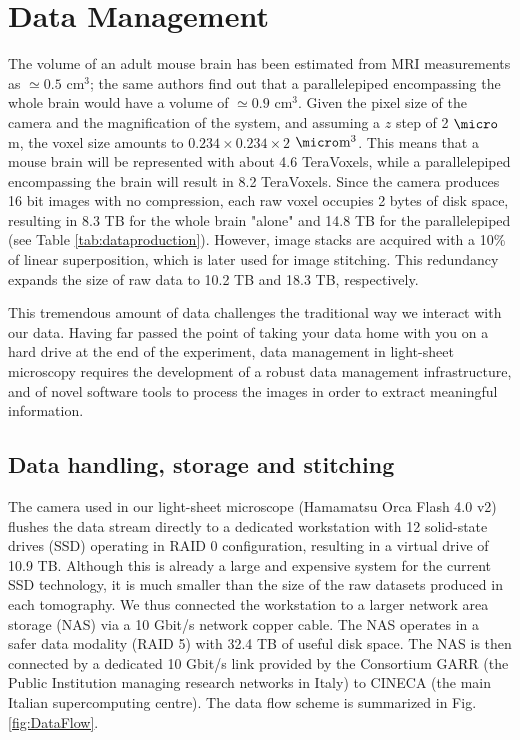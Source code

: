 \documentclass[12pt]{spieman}  %
\begin{document}
\section{Data Management}

The volume of an adult mouse brain has been estimated from MRI measurements \cite{Kovacevic2005} as $\simeq 0.5$ $\text{cm}^3$; the same authors find out that a parallelepiped encompassing the whole brain would have a volume of $\simeq 0.9$ $\text{cm}^3$. Given the pixel size of the camera and the magnification of the system, and assuming a $z$ step of 2 $\micro$m, the voxel size amounts to $0.234\times0.234\times2$ $\micro\text{m}^3$. This means that a mouse brain will be represented with about 4.6 TeraVoxels, while a parallelepiped encompassing the brain will result in 8.2 TeraVoxels. Since the camera produces 16 bit images with no compression, each raw voxel occupies 2 bytes of disk space, resulting in 8.3 TB for the whole brain "alone" and 14.8 TB for the parallelepiped (see Table \ref{tab:dataproduction}). However, image stacks are acquired with a 10\% of linear superposition, which is later used for image stitching. This redundancy expands the size of raw data to 10.2 TB and 18.3 TB, respectively.

This tremendous amount of data challenges the traditional way we interact with our data. Having far passed the point of taking your data home with you on a hard drive at the end of the experiment, data management in light-sheet microscopy requires the development of a robust data management infrastructure, and of novel software tools to process the images in order to extract meaningful information.

\subsection{Data handling, storage and stitching}

The camera used in our light-sheet microscope (Hamamatsu Orca Flash 4.0 v2) flushes the data stream directly to a dedicated workstation with 12 solid-state drives (SSD) operating in RAID 0 configuration, resulting in a virtual drive of 10.9 TB. Although this is already a large and expensive system for the current SSD technology, it is much smaller than the size of the raw datasets produced in each tomography. We thus connected the workstation to a larger network area storage (NAS) via a 10 Gbit/s network copper cable. The NAS operates in a safer data modality (RAID 5) with 32.4 TB of useful disk space. The NAS is then connected by a dedicated 10 Gbit/s link provided by the Consortium GARR (the Public Institution managing research networks in Italy) to CINECA (the main Italian supercomputing centre). The data flow scheme is summarized in Fig. \ref{fig:DataFlow}.
\end{document}
